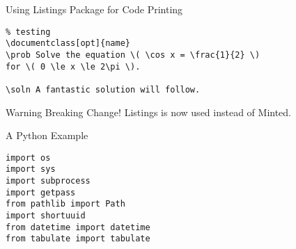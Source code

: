 \documentclass[\string~/GitHub/sthlmNordBeamerTheme/sthlmNordLightDemo.tex]{subfiles}
\begin{document}
\begin{frame}{Using Listings Package for Code Printing}

\begin{verbatim}
% testing
\documentclass[opt]{name}
\prob Solve the equation \( \cos x = \frac{1}{2} \)
for \( 0 \le x \le 2\pi \).

\soln A fantastic solution will follow.
\end{verbatim}

\begin{alertblock}{Warning}
  Breaking Change!  Listings is now used instead of Minted.
\end{alertblock}
\end{frame}


\begin{frame}{A Python Example}

\begin{verbatim}
import os
import sys
import subprocess
import getpass
from pathlib import Path
import shortuuid
from datetime import datetime
from tabulate import tabulate
\end{verbatim}
\end{frame}
\end{document}
